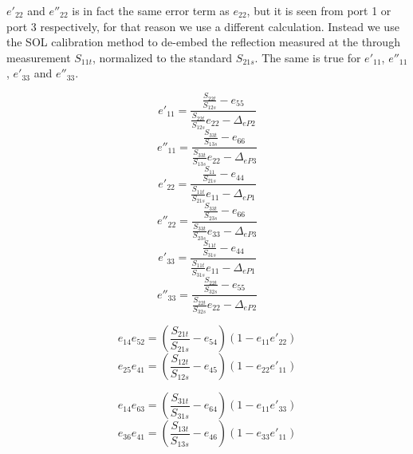 $e'_{22}$ and $e''_{22}$ is in fact the same error term as $e_{22}$, but it is seen from port 1 or port 3 respectively, for that reason we use a different calculation. Instead we use the SOL calibration method to de-embed the reflection measured at the through measurement $S_{11t}$, normalized to the standard $S_{21s}$. The same is true for $e'_{11}$, $e''_{11}$, $e'_{33}$ and $e''_{33}$. 

\begin{equation}
\label{eqn:e'11_3p}
e'_{11} = \frac{\frac{S_{22t}}{S_{12s}}-e_{55}}{\frac{S_{22t}}{S_{12s}}e_{22}-\Delta_{eP2}}
\end{equation}
\begin{equation}
\label{eqn:e''11_3p}
e''_{11} = \frac{\frac{S_{33t}}{S_{13s}}-e_{66}}{\frac{S_{33t}}{S_{13s}}e_{22}-\Delta_{eP3}}
\end{equation}
\begin{equation}
\label{eqn:e'22_3p}
e'_{22} = \frac{\frac{S_{11}}{S_{21s}}-e_{44}}{\frac{S_{11t}}{S_{21s}}e_{11}-\Delta_{eP1}}
\end{equation}
\begin{equation}
\label{eqn:e''22_3p}
e''_{22} = \frac{\frac{S_{33t}}{S_{23s}}-e_{66}}{\frac{S_{33t}}{S_{23s}}e_{33}-\Delta_{eP3}}
\end{equation}
\begin{equation}
\label{eqn:e'33_3p}
e'_{33} = \frac{\frac{S_{11t}}{S_{31s}}-e_{44}}{\frac{S_{11t}}{S_{31s}}e_{11}-\Delta_{eP1}}
\end{equation}
\begin{equation}
\label{eqn:e''33_3p}
e''_{33} = \frac{\frac{S_{22t}}{S_{32s}}-e_{55}}{\frac{S_{22t}}{S_{32s}}e_{22}-\Delta_{eP2}}
\end{equation}

\begin{equation}
\label{eqn:e14e52_3p}
e_{14}e_{52} = \left(\frac{S_{21t}}{S_{21s}} - e_{54}\right)\left(1-e_{11}e'_{22}\right)
\end{equation}
\begin{equation}
\label{eqn:e25e41_3p}
e_{25}e_{41} = \left(\frac{S_{12t}}{S_{12s}} - e_{45}\right)\left(1-e_{22}e'_{11}\right)
\end{equation}

\begin{equation}
\label{eqn:e14e63_3p}
e_{14}e_{63} = \left(\frac{S_{31t}}{S_{31s}} - e_{64}\right)\left(1-e_{11}e'_{33}\right)
\end{equation}
\begin{equation}
\label{eqn:e36e41_3p}
e_{36}e_{41} = \left(\frac{S_{13t}}{S_{13s}} - e_{46}\right)\left(1-e_{33}e'_{11}\right)
\end{equation}

